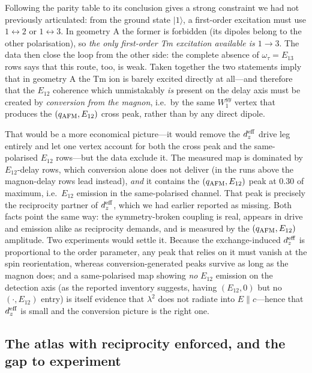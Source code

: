 \documentclass[11pt]{article}
\newcommand{\ket}[1]{|#1\rangle}
\newcommand{\qafm}{q_{\rm AFM}}
\begin{document}
Following the parity table to its conclusion gives a strong constraint
we had not previously articulated: from the ground state $\ket1$, a
first-order excitation must use $1\!\leftrightarrow\!2$ or
$1\!\leftrightarrow\!3$.  In geometry A the former is forbidden (its
dipoles belong to the other polarisation), so \emph{the only
first-order Tm excitation available is $1\!\to\!3$}.  The data then
close the loop from the other side: the complete absence of
$\omega_\tau=E_{13}$ rows says that this route, too, is weak.  Taken
together the two statements imply that in geometry A the Tm ion is
barely excited directly at all---and therefore that the $E_{12}$
coherence which unmistakably \emph{is} present on the delay axis must
be created by \emph{conversion from the magnon}, i.e.\ by the same
$W^{yy}_1$ vertex that produces the $(\qafm,E_{12})$ cross peak, rather
than by any direct dipole.

That would be a more economical picture---it would remove the
$d_z^{\rm eff}$ drive leg entirely and let one vertex account for both
the cross peak and the same-polarised $E_{12}$ rows---but the data
exclude it.  The measured map is dominated by $E_{12}$-delay rows,
which conversion alone does not deliver (in the runs above the
magnon-delay rows lead instead), \emph{and} it contains the
$(\qafm,E_{12})$ peak at $0.30$ of maximum, i.e.\ $E_{12}$ emission in
the same-polarised channel.  That peak is precisely the reciprocity
partner of $d_z^{\rm eff}$, which we had earlier reported as missing.
Both facts point the same way: the symmetry-broken coupling is real,
appears in drive and emission alike as reciprocity demands, and is
measured by the $(\qafm,E_{12})$ amplitude.  Two experiments would settle it.  Because the
exchange-induced $d_z^{\rm eff}$ is proportional to the order
parameter, any peak that relies on it must vanish at the spin
reorientation, whereas conversion-generated peaks survive as long as
the magnon does; and a same-polarised map showing \emph{no} $E_{12}$
emission on the detection axis (as the reported inventory suggests,
having $(E_{12},0)$ but no $(\cdot,E_{12})$ entry) is itself evidence
that $\lambda^2$ does not radiate into $E\!\parallel\!c$---hence that
$d_z^{\rm eff}$ is small and the conversion picture is the right one.

\subsection{The atlas with reciprocity enforced, and the gap to experiment}
\label{si:recipatlas}
\end{document}
